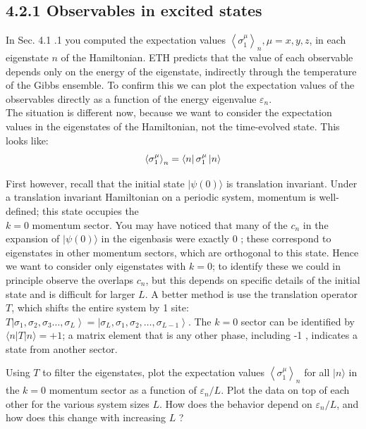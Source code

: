 \documentclass[12pt]{article}
\begin{document}
\subsection*{4.2.1 Observables in excited states}
In Sec. 4.1 .1 you computed the expectation values $\left\langle\sigma_{1}^{\mu}\right\rangle_{n}, \mu=x, y, z$, in each eigenstate $n$ of the Hamiltonian. ETH predicts that the value of each observable depends only on the energy of the eigenstate, indirectly through the temperature of the Gibbs ensemble. To confirm this we can plot the expectation values of the observables directly as a function of the energy eigenvalue $\varepsilon_{n}$.\\
The situation is different now, because we want to consider the expectation values in the eigenstates of the Hamiltonian, not the time-evolved state.
This looks like:
\begin{equation}
\left\langle\sigma_{1}^{\mu}\right\rangle_{n}=\bra{n}\sigma_{1}^{\mu}\ket{n}
\end{equation}

First however, recall that the initial state $|\psi(0)\rangle$ is translation invariant. Under a translation invariant Hamiltonian on a periodic system, momentum is well-defined; this state occupies the\\
$k=0$ momentum sector. You may have noticed that many of the $c_{n}$ in the expansion of $|\psi(0)\rangle$ in the eigenbasis were exactly 0 ; these correspond to eigenstates in other momentum sectors, which are orthogonal to this state. Hence we want to consider only eigenstates with $k=0$; to identify these we could in principle observe the overlaps $c_{n}$, but this depends on specific details of the initial state and is difficult for larger $L$. A better method is use the translation operator $T$, which shifts the entire system by 1 site: $T\left|\sigma_{1}, \sigma_{2}, \sigma_{3} \ldots, \sigma_{L}\right\rangle=\left|\sigma_{L}, \sigma_{1}, \sigma_{2}, \ldots, \sigma_{L-1}\right\rangle$. The $k=0$ sector can be identified by $\langle n|T| n\rangle=+1$; a matrix element that is any other phase, including -1 , indicates a state from another sector.

Using $T$ to filter the eigenstates, plot the expectation values $\left\langle\sigma_{1}^{\mu}\right\rangle_{n}$ for all $|n\rangle$ in the $k=0$ momentum sector as a function of $\varepsilon_{n} / L$. Plot the data on top of each other for the various system sizes $L$. How does the behavior depend on $\varepsilon_{n} / L$, and how does this change with increasing $L$ ?
\end{document}
